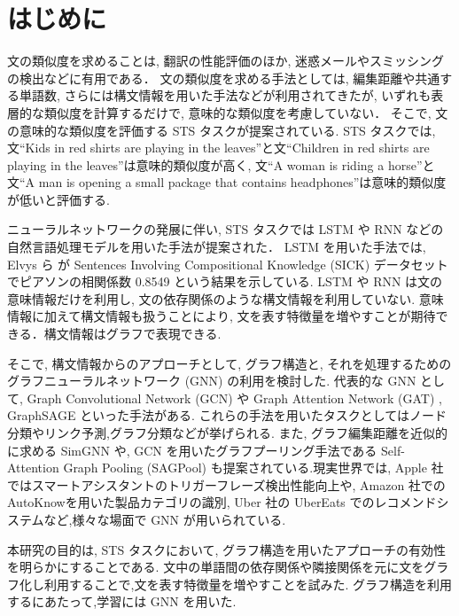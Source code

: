 \documentclass[a4j,12pt]{thesis} %
\begin{document}
\newcommand{\ctext}[1]{\raise0.2ex\hbox{\textcircled{\scriptsize{#1}}}}
\setlength{\baselineskip}{1.95zw}
\setlength{\textheight}{30\baselineskip}
\mainmatter

\fi
\renewcommand\thefootnote{\arabic{footnote}}



\chapter{はじめに}\label{intro}
文の類似度を求めることは, 翻訳の性能評価のほか, 迷惑メールやスミッシングの検出などに有用である．
文の類似度を求める手法としては, 編集距離や共通する単語数, さらには構文情報を用いた手法などが利用されてきたが, いずれも表層的な類似度を計算するだけで, 意味的な類似度を考慮していない．
そこで, 文の意味的な類似度を評価する STS タスクが提案されている.
STS タスクでは, 文``Kids in red shirts are playing in the leaves''と文``Children in red shirts are playing in the leaves''は意味的類似度が高く, 文``A woman is riding a horse''と文``A man is opening a small package that contains headphones''は意味的類似度が低いと評価する.
\par ニューラルネットワークの発展に伴い, STS タスクでは LSTM や RNN などの自然言語処理モデルを用いた手法が提案された．
LSTM を用いた手法では, Elvys ら \cite{elvys2018predicting} が Sentences Involving Compositional Knowledge (SICK) データセットでピアソンの相関係数 0.8549 という結果を示している.
LSTM や RNN は文の意味情報だけを利用し, 文の依存関係のような構文情報を利用していない.
意味情報に加えて構文情報も扱うことにより, 文を表す特徴量を増やすことが期待できる．構文情報はグラフで表現できる.
\par そこで, 構文情報からのアプローチとして, グラフ構造と, それを処理するためのグラフニューラルネットワーク (GNN) の利用を検討した.
代表的な GNN として, Graph Convolutional Network (GCN) \cite{kipf2017semi} や Graph Attention Network (GAT) \cite{velickovic2018graph}, GraphSAGE \cite{hamilton2017inductive} といった手法がある. これらの手法を用いたタスクとしてはノード分類やリンク予測,グラフ分類などが挙げられる. また, グラフ編集距離を近似的に求める SimGNN や, GCN を用いたグラフプーリング手法である Self-Attention Graph Pooling (SAGPool) も提案されている.現実世界では,
Apple 社ではスマートアシスタントのトリガーフレーズ検出性能向上\cite{pranay2020lattice}や, Amazon 社でのAutoKnow\cite{xin2020autoknow}を用いた製品カテゴリの識別, Uber 社の UberEats でのレコメンドシステムなど,様々な場面で GNN が用いられている.
\par 本研究の目的は, STS タスクにおいて, グラフ構造を用いたアプローチの有効性を明らかにすることである.
文中の単語間の依存関係や隣接関係を元に文をグラフ化し利用することで,文を表す特徴量を増やすことを試みた.
グラフ構造を利用するにあたって,学習には GNN を用いた.
\end{document}
